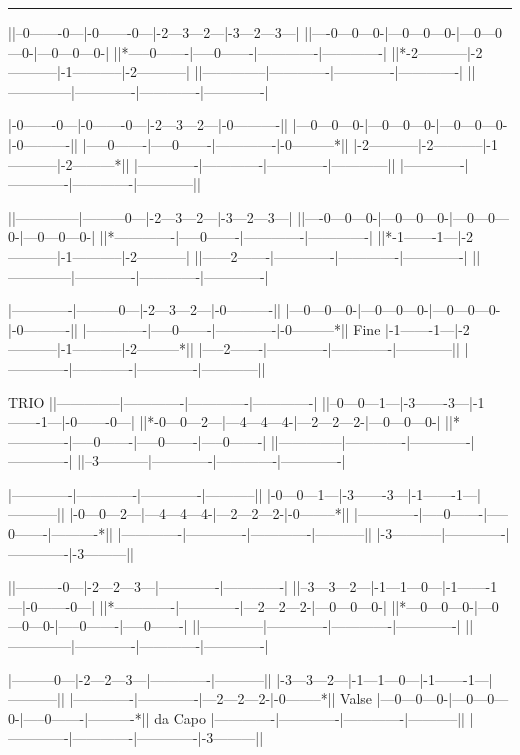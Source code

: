 \noindent\rule{\columnwidth}{1pt}

\begin{lsttab}
||--0-------0---|-0-------0---|-2---3---2---|-3---2---3---|
||----0---0---0-|---0---0---0-|---0---0---0-|---0---0---0-|
||*-----0-------|-----0-------|-------------|-------------|
||*-2-----------|-2-----------|-1-----------|-2-----------|
||--------------|-------------|-------------|-------------|
||--------------|-------------|-------------|-------------|

|-0-------0---|-0-------0---|-2---3---2---|-0----------||
|---0---0---0-|---0---0---0-|---0---0---0-|-0----------||
|-----0-------|-----0-------|-------------|-0---------*||
|-2-----------|-2-----------|-1-----------|-2---------*||
|-------------|-------------|-------------|------------||
|-------------|-------------|-------------|------------||

||--------------|---------0---|-2---3---2---|-3---2---3---|
||----0---0---0-|---0---0---0-|---0---0---0-|---0---0---0-|
||*-------------|-----0-------|-------------|-------------|
||*-1-------1---|-2-----------|-1-----------|-2-----------|
||------2-------|-------------|-------------|-------------|
||--------------|-------------|-------------|-------------|

|-------------|---------0---|-2---3---2---|-0----------||
|---0---0---0-|---0---0---0-|---0---0---0-|-0----------||
|-------------|-----0-------|-------------|-0---------*|| Fine
|-1-------1---|-2-----------|-1-----------|-2---------*||
|-----2-------|-------------|-------------|------------||
|-------------|-------------|-------------|------------||

TRIO
||--------------|-------------|-------------|-------------|
||--0---0---1---|-3-------3---|-1-------1---|-0-------0---|
||*-0---0---2---|---4---4---4-|---2---2---2-|---0---0---0-|
||*-------------|-----0-------|-----0-------|-----0-------|
||--------------|-------------|-------------|-------------|
||--3-----------|-------------|-------------|-------------|

|-------------|-------------|-------------|-----------||
|-0---0---1---|-3-------3---|-1-------1---|-----------||
|-0---0---2---|---4---4---4-|---2---2---2-|-0--------*||
|-------------|-----0-------|-----0-------|----------*||
|-------------|-------------|-------------|-----------||
|-3-----------|-------------|-------------|-3---------||

||----------0---|-2---2---3---|-------------|-------------|
||--3---3---2---|-1---1---0---|-1-------1---|-0-------0---|
||*-------------|-------------|---2---2---2-|---0---0---0-|
||*---0---0---0-|---0---0---0-|-----0-------|-----0-------|
||--------------|-------------|-------------|-------------|
||--------------|-------------|-------------|-------------|

|---------0---|-2---2---3---|-------------|-----------||
|-3---3---2---|-1---1---0---|-1-------1---|-----------||
|-------------|-------------|---2---2---2-|-0--------*|| Valse
|---0---0---0-|---0---0---0-|-----0-------|----------*|| da Capo
|-------------|-------------|-------------|-----------||
|-------------|-------------|-------------|-3---------||
\end{lsttab}
\newpage

